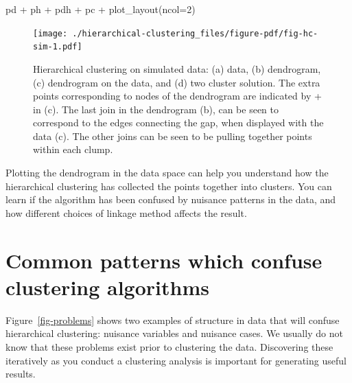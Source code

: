 \documentclass[
  letterpaper,
]{book}
\newenvironment{Shaded}{\begin{snugshade}}{\end{snugshade}}
\newcommand{\AttributeTok}[1]{\textcolor[rgb]{0.40,0.45,0.13}{#1}}
\newcommand{\DecValTok}[1]{\textcolor[rgb]{0.68,0.00,0.00}{#1}}
\newcommand{\FunctionTok}[1]{\textcolor[rgb]{0.28,0.35,0.67}{#1}}
\newcommand{\NormalTok}[1]{\textcolor[rgb]{0.00,0.23,0.31}{#1}}
\newcommand{\SpecialCharTok}[1]{\textcolor[rgb]{0.37,0.37,0.37}{#1}}
\begin{document}
\begin{Shaded}
\begin{Highlighting}[]
\NormalTok{pd }\SpecialCharTok{+}\NormalTok{ ph }\SpecialCharTok{+}\NormalTok{ pdh }\SpecialCharTok{+}\NormalTok{ pc }\SpecialCharTok{+} \FunctionTok{plot\_layout}\NormalTok{(}\AttributeTok{ncol=}\DecValTok{2}\NormalTok{)}
\end{Highlighting}
\end{Shaded}

\begin{figure}[H]

{\centering \texttt{[image: ./hierarchical-clustering\_files/figure-pdf/fig-hc-sim-1.pdf]}

}

\caption{\label{fig-hc-sim}Hierarchical clustering on simulated data:
(a) data, (b) dendrogram, (c) dendrogram on the data, and (d) two
cluster solution. The extra points corresponding to nodes of the
dendrogram are indicated by + in (c). The last join in the dendrogram
(b), can be seen to correspond to the edges connecting the gap, when
displayed with the data (c). The other joins can be seen to be pulling
together points within each clump.}

\end{figure}

Plotting the dendrogram in the data space can help you understand how
the hierarchical clustering has collected the points together into
clusters. You can learn if the algorithm has been confused by nuisance
patterns in the data, and how different choices of linkage method
affects the result.

\hypertarget{common-patterns-which-confuse-clustering-algorithms}{%
\section{Common patterns which confuse clustering
algorithms}\label{common-patterns-which-confuse-clustering-algorithms}}

Figure~\ref{fig-problems} shows two examples of structure in data that
will confuse hierarchical clustering: nuisance variables and nuisance
cases. We usually do not know that these problems exist prior to
clustering the data. Discovering these iteratively as you conduct a
clustering analysis is important for generating useful results.
\end{document}
